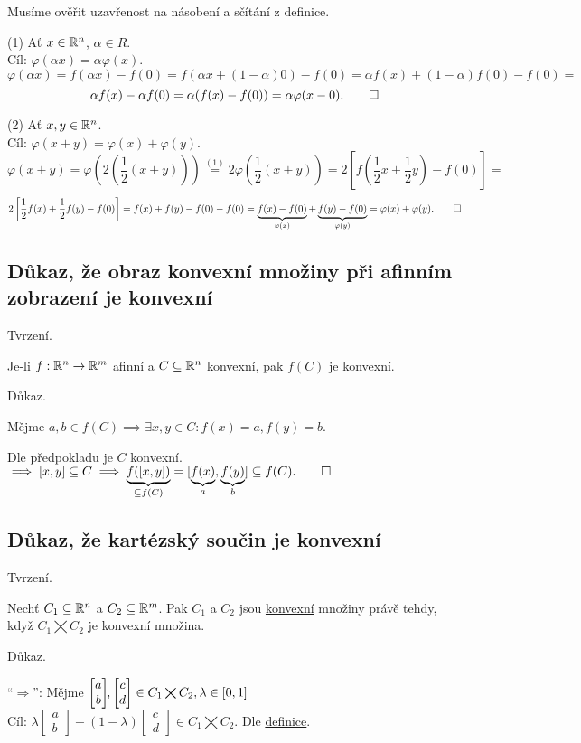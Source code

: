 Musíme ověřit uzavřenost na násobení a sčítání z definice.

(1) Ať $x \in \mathbb{R}^n$, $\alpha \in R$.\\
Cíl: $\varphi(\alpha x) = \alpha \varphi(x)$.
\[
    \varphi(\alpha x) = f(\alpha x) - f(0) = f(\alpha x + (1-\alpha)0) - f(0) = \alpha f(x) + (1-\alpha)f(0) - f(0) =
\]
\[
    \alpha f(x) - \alpha f(0) = \alpha (f(x) - f(0)) = \alpha \varphi (x-0). \qed
\]

(2) Ať $x, y \in \mathbb{R}^n$.\\
Cíl: $\varphi(x+y) = \varphi(x) + \varphi(y)$.
\[
    \varphi(x+y) = 
    \varphi \left(2 \left(\frac{1}{2} (x+y)\right)\right) \stackrel{(1)}{=} 2 \varphi \left(\frac{1}{2} (x+y)\right) =
    2 \left[f(\frac{1}{2}x + \frac{1}{2}y) - f(0)\right] = 
\]
\[
    2 \left[\frac{1}{2} f(x) + \frac{1}{2}f(y) - f(0) \right] = f(x) + f(y) - f(0) - f(0) = 
    \underbrace{f(x) - f(0)}_{\varphi(x)} + \underbrace{f(y) - f(0)}_{\varphi(y)} =
    \varphi(x) + \varphi(y). \qed
\]

\subsection{Důkaz, že obraz konvexní množiny při afinním zobrazení je konvexní}
Tvrzení.

Je-li $f: \mathbb{R}^n \rightarrow \mathbb{R}^m$ \hyperref[sec:afin]{afinní} a $C \subseteq \mathbb{R}^n$ \hyperref[sec:konvex]{konvexní}, pak
$f(C)$ je konvexní.

Důkaz.

Mějme $a, b \in f(C) \implies \exists x, y \in C: f(x)=a, f(y)=b$.

Dle předpokladu je $C$ konvexní. $\implies [x, y] \subseteq C \implies \underbrace{f([x, y])}_{\subseteq f(C)} =
[\underbrace{f(x)}_a, \underbrace{f(y)}_b] \subseteq f(C). \qed$

\subsection{Důkaz, že kartézský součin je konvexní}
Tvrzení.

Nechť $C_1 \subseteq \mathbb{R}^n$ a $C_2 \subseteq \mathbb{R}^m$. Pak $C_1$ a $C_2$ jsou \hyperref[sec:konvex]{konvexní} množiny právě 
tehdy, když $C_1 \bigtimes C_2$ je konvexní množina.

Důkaz.

\enquote{$\Rightarrow$}: Mějme
$
\begin{bmatrix}
    a \\
    b
\end{bmatrix}\hspace{-1mm}\text{,}
\begin{bmatrix}
    c \\
    d
\end{bmatrix} \in C_1 \bigtimes C_2, \lambda \in [0,1]$\\
Cíl:
$
\lambda \begin{bmatrix}
    a \\
    b
\end{bmatrix}
+ (1-\lambda)
\begin{bmatrix}
    c \\
    d
\end{bmatrix} \in C_1 \bigtimes C_2.$ Dle \hyperref[sec:konvex]{definice}.

